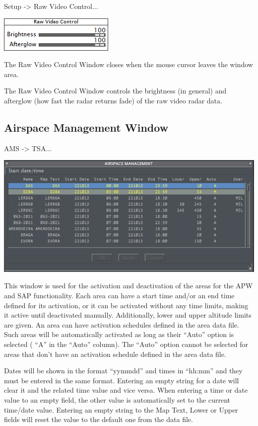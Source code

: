 \documentclass[11pt,a4paper]{memoir}
\begin{document}
\textit{} Setup -> Raw Video Control...

\includegraphics{img/rawvideo.png}

The Raw Video Control Window closes when the mouse cursor leaves the window area.

The Raw Video Control Window controls the brightness (in general) and afterglow (how fast the radar returns fade) of the raw video radar data.

\subsection{Airspace Management Window}
\label{win:amw}

\textit{} AMS -> TSA...

\includegraphics{img/tsa.png}

This window is used for the activation and deactivation of the areas for the APW and SAP functionality. Each area can have a start time and/or an end time defined for its activation, or it can be activated without any time limits, making it active until deactivated manually. Additionally, lower and upper altitude limits are given. An area can have activation schedules defined in the area data file. Such areas will be automatically activated as long as their “Auto” option is selected ( “A” in the “Auto” column). The “Auto” option cannot be selected for areas that don’t have an activation schedule defined in the area data file.

Dates will be shown in the format “yymmdd” and times in “hh:mm” and they must be entered in the same format. Entering an empty string for a date will clear it and the related time value and vice versa. When entering a time or date value to an empty field, the other value is automatically set to the current time/date value. Entering an empty string to the Map Text, Lower or Upper fields will reset the value to the default one from the data file.
\end{document}
